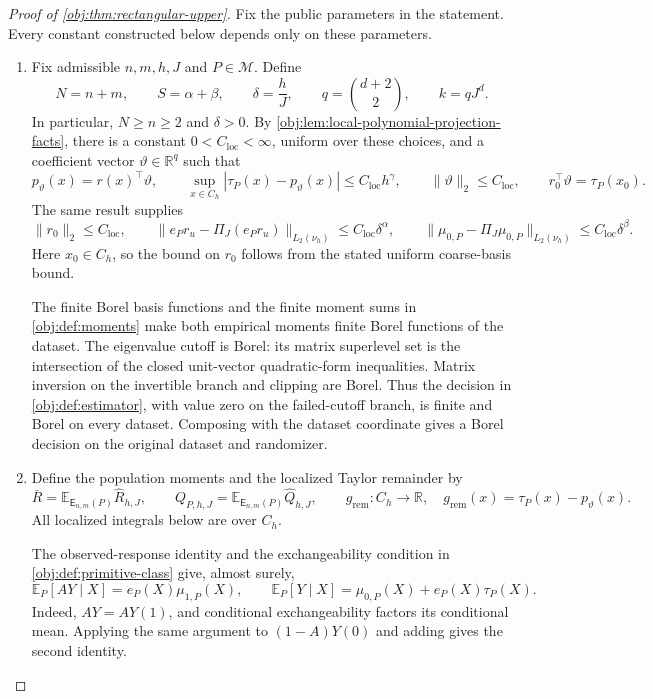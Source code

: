 \documentclass[11pt]{article}
\begin{document}
\begin{proof}[Proof of \cref{obj:thm:rectangular-upper}]
Fix the public parameters in the statement. Every constant constructed below depends only on these parameters.

\begin{enumerate}
\item Fix admissible \(n,m,h,J\) and \(P\in\mathcal M\). Define
\[
N=n+m,\qquad S=\alpha+\beta,\qquad
\delta=\frac hJ,\qquad
q=\binom{d+2}{2},\qquad k=qJ^d.
\]
In particular, \(N\ge n\ge2\) and \(\delta>0\).
By \cref{obj:lem:local-polynomial-projection-facts}, there is a constant
\(0<C_{\mathrm{loc}}<\infty\), uniform over these choices, and a coefficient vector
\(\vartheta\in\mathbb R^q\) such that
\[
p_\vartheta(x)=r(x)^\top\vartheta,\qquad
\sup_{x\in C_h}|\tau_P(x)-p_\vartheta(x)|
 \le C_{\mathrm{loc}}h^\gamma,\qquad
\|\vartheta\|_2\le C_{\mathrm{loc}},
\qquad
r_0^\top\vartheta=\tau_P(x_0).
\]
The same result supplies
\[
\|r_0\|_2\le C_{\mathrm{loc}},\qquad
\|e_Pr_u-\Pi_J(e_Pr_u)\|_{L_2(\nu_h)}
 \le C_{\mathrm{loc}}\delta^\alpha,\qquad
\|\mu_{0,P}-\Pi_J\mu_{0,P}\|_{L_2(\nu_h)}
 \le C_{\mathrm{loc}}\delta^\beta.
\]
Here \(x_0\in C_h\), so the bound on \(r_0\) follows from the stated uniform coarse-basis bound.

The finite Borel basis functions and the finite moment sums in
\cref{obj:def:moments} make both empirical moments finite Borel functions of the dataset.
The eigenvalue cutoff is Borel: its matrix superlevel set is the intersection of the closed unit-vector quadratic-form inequalities. Matrix inversion on the invertible branch and clipping are Borel. Thus the decision in
\cref{obj:def:estimator}, with value zero on the failed-cutoff branch, is finite and Borel on every dataset. Composing with the dataset coordinate gives a Borel decision on the original dataset and randomizer.%

\item Define the population moments and the localized Taylor remainder by
\[
\bar R=\mathbb E_{\mathsf E_{n,m}(P)}\widehat R_{h,J},
\qquad
Q_{P,h,J}=\mathbb E_{\mathsf E_{n,m}(P)}\widehat Q_{h,J},
\qquad
g_{\mathrm{rem}}:C_h\longrightarrow\mathbb R,\quad
g_{\mathrm{rem}}(x)=\tau_P(x)-p_\vartheta(x).
\]
All localized integrals below are over \(C_h\).

The observed-response identity and the exchangeability condition in
\cref{obj:def:primitive-class} give, almost surely,
\[
\mathbb E_P[AY\mid X]=e_P(X)\mu_{1,P}(X),
\qquad
\mathbb E_P[Y\mid X]
 =\mu_{0,P}(X)+e_P(X)\tau_P(X).
\]
Indeed, \(AY=AY(1)\), and conditional exchangeability factors its conditional mean. Applying the same argument to \((1-A)Y(0)\) and adding gives the second identity.


\end{enumerate}
\end{proof}
\end{document}
